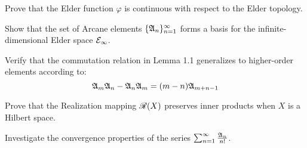 \begin{problemset}
\item Prove that the Elder function $\varphi$ is continuous with respect to the Elder topology.
\item Show that the set of Arcane elements $\{\mathfrak{A}_{n}\}_{n=1}^{\infty}$ forms a basis for the infinite-dimensional Elder space $\mathcal{E}_{\infty}$.
\item Verify that the commutation relation in Lemma 1.1 generalizes to higher-order elements according to:
\begin{equation}
\mathfrak{A}_{m}\mathfrak{A}_{n} - \mathfrak{A}_{n}\mathfrak{A}_{m} = (m-n)\mathfrak{A}_{m+n-1}
\end{equation}
\item Prove that the Realization mapping $\mathscr{R}(X)$ preserves inner products when $X$ is a Hilbert space.
\item Investigate the convergence properties of the series $\sum_{n=1}^{\infty} \frac{\mathfrak{A}_{n}}{n!}$.
\end{problemset}

